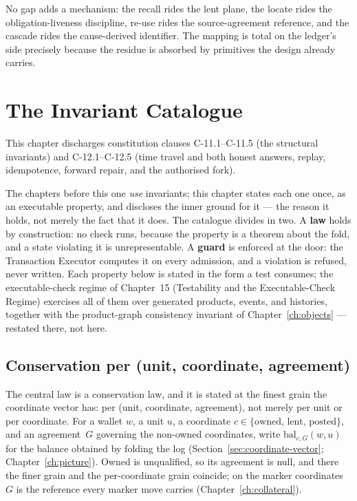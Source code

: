 \documentclass[11pt,a4paper]{article}
\begin{document}
No gap adds a mechanism: the recall rides the lent plane, the locate rides the
obligation-liveness discipline, re-use rides the source-agreement reference, and
the cascade rides the cause-derived identifier. The mapping is total on the
ledger's side precisely because the residue is absorbed by primitives the design
already carries.

\section{The Invariant Catalogue}\label{ch:invariants}

This chapter discharges constitution clauses C-11.1--C-11.5 (the structural invariants) and C-12.1--C-12.5 (time travel and both honest answers, replay, idempotence, forward repair, and the authorised fork).

The chapters before this one \emph{use} invariants; this chapter states each one
once, as an executable property, and discloses the inner ground for it --- the
reason it holds, not merely the fact that it does. The catalogue divides in two.
A \textbf{law} holds by construction: no check runs, because the property is a
theorem about the fold, and a state violating it is unrepresentable. A
\textbf{guard} is enforced at the door: the Transaction Executor computes it on
every admission, and a violation is refused, never written. Each property below
is stated in the form a test consumes; the executable-check regime of Chapter~15
(Testability and the Executable-Check Regime) exercises all of them over
generated products, events, and histories, together with the product-graph
consistency invariant of Chapter~\ref{ch:objects} --- restated there, not here.

\subsection{Conservation per (unit, coordinate, agreement)}

The central law is a conservation law, and it is stated at the finest grain the coordinate
vector has: per (unit, coordinate, agreement), not merely per unit or per coordinate. For a
wallet $w$, a unit $u$, a coordinate $c\in\{\text{owned, lent, posted}\}$, and an
agreement~$G$ governing the non-owned coordinates, write $\mathrm{bal}_{c,G}(w,u)$ for the
balance obtained by folding the log (Section~\ref{sec:coordinate-vector};
Chapter~\ref{ch:picture}). Owned is unqualified, so its agreement is null, and there the
finer grain and the per-coordinate grain coincide; on the marker coordinates $G$ is the
reference every marker move carries (Chapter~\ref{ch:collateral}).
\end{document}
